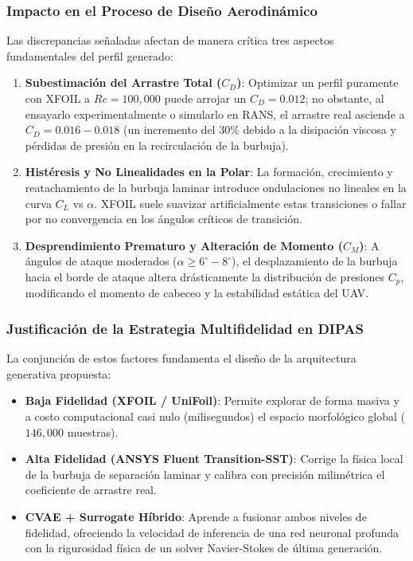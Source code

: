 \begin{enumerate}
\subsubsection{Impacto en el Proceso de Diseño Aerodinámico}
Las discrepancias señaladas afectan de manera crítica tres aspectos fundamentales del perfil generado:
\begin{enumerate}
    \item \textbf{Subestimación del Arrastre Total ($C_D$)}: Optimizar un perfil puramente con XFOIL a $Re = 100{,}000$ puede arrojar un $C_D = 0.012$; no obstante, al ensayarlo experimentalmente o simularlo en RANS, el arrastre real asciende a $C_D = 0.016 - 0.018$ (un incremento del $30\%$ debido a la disipación viscosa y pérdidas de presión en la recirculación de la burbuja).
    \item \textbf{Histéresis y No Linealidades en la Polar}: La formación, crecimiento y reatachamiento de la burbuja laminar introduce ondulaciones no lineales en la curva $C_L$ vs $\alpha$. XFOIL suele suavizar artificialmente estas transiciones o fallar por no convergencia en los ángulos críticos de transición.
    \item \textbf{Desprendimiento Prematuro y Alteración de Momento ($C_M$)}: A ángulos de ataque moderados ($\alpha \ge 6^\circ - 8^\circ$), el desplazamiento de la burbuja hacia el borde de ataque altera drásticamente la distribución de presiones $C_p$, modificando el momento de cabeceo y la estabilidad estática del UAV.
\end{enumerate}

\subsubsection{Justificación de la Estrategia Multifidelidad en DIPAS}
La conjunción de estos factores fundamenta el diseño de la arquitectura generativa propuesta:
\begin{itemize}
    \item \textbf{Baja Fidelidad (XFOIL / UniFoil)}: Permite explorar de forma masiva y a costo computacional casi nulo (milisegundos) el espacio morfológico global ($146{,}000$ muestras).
    \item \textbf{Alta Fidelidad (ANSYS Fluent Transition-SST)}: Corrige la física local de la burbuja de separación laminar y calibra con precisión milimétrica el coeficiente de arrastre real.
    \item \textbf{CVAE + Surrogate Híbrido}: Aprende a fusionar ambos niveles de fidelidad, ofreciendo la velocidad de inferencia de una red neuronal profunda con la rigurosidad física de un solver Navier-Stokes de última generación.
\end{itemize}


\end{enumerate}
